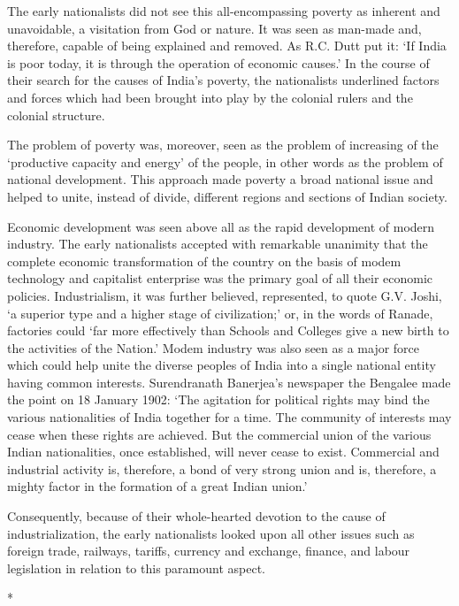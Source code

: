 The early nationalists did not see this all-encompassing poverty as inherent and unavoidable, a visitation from God or nature. It was seen as man-made and, therefore, capable of being explained and removed. As R.C. Dutt put it: ‘If India is poor today, it is through the operation of economic causes.’ In the course of their search for the causes of India’s poverty, the nationalists underlined factors and forces which had been brought into play by the colonial rulers and the colonial structure.

The problem of poverty was, moreover, seen as the problem of increasing of the ‘productive capacity and energy’ of the people, in other words as the problem of national development. This approach made poverty a broad national issue and helped to unite, instead of divide, different regions and sections of Indian society.

Economic development was seen above all as the rapid development of modern industry. The early nationalists accepted with remarkable unanimity that the complete economic transformation of the country on the basis of modem technology and capitalist enterprise was the primary goal of all their economic policies. Industrialism, it was further believed, represented, to quote G.V. Joshi, ‘a superior type and a higher stage of civilization;’ or, in the words of Ranade, factories could ‘far more effectively than Schools and Colleges give a new birth to the activities of the Nation.’ Modem industry was also seen as a major force which could help unite the diverse peoples of India into a single national entity having common interests. Surendranath Banerjea’s newspaper the Bengalee made the point on 18 January 1902: ‘The agitation for political rights may bind the various nationalities of India together for a time. The community of interests may cease when these rights are achieved. But the commercial union of the various Indian nationalities, once established, will never cease to exist. Commercial and industrial activity is, therefore, a bond of very strong union and is, therefore, a mighty factor in the formation of a great Indian union.’

Consequently, because of their whole-hearted devotion to the cause of industrialization, the early nationalists looked upon all other issues such as foreign trade, railways, tariffs, currency and exchange, finance, and labour legislation in relation to this paramount aspect.

\begin{center}*\end{center}



